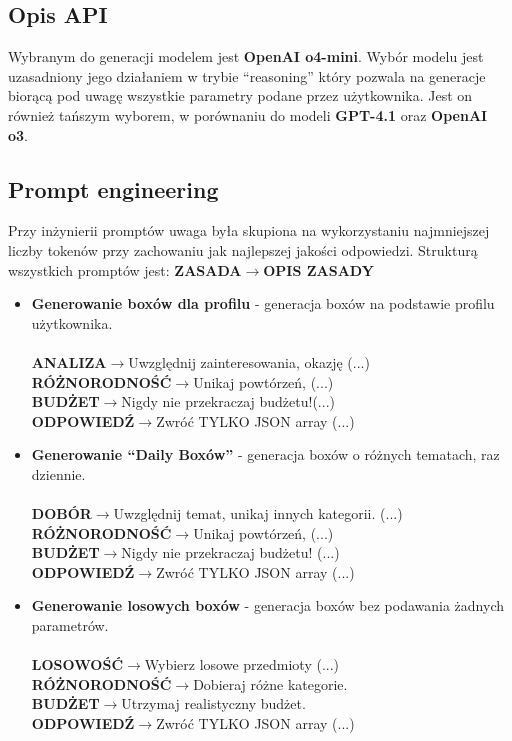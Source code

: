 \documentclass[a4paper, 12pt]{article}
\begin{document}
\subsection{Opis API}
Wybranym do generacji modelem jest \textbf{OpenAI o4-mini}.
Wybór modelu jest uzasadniony
jego działaniem w trybie ``reasoning'' który pozwala na generacje biorącą pod
uwagę wszystkie parametry podane przez użytkownika.
Jest on również tańszym wyborem, w porównaniu do modeli \textbf{GPT-4.1} oraz \textbf{OpenAI o3}.
\subsection{Prompt engineering}
Przy inżynierii promptów uwaga była skupiona na wykorzystaniu najmniejszej liczby tokenów przy zachowaniu jak najlepszej jakości odpowiedzi.
Strukturą wszystkich promptów jest:
\textbf{ZASADA}$\rightarrow$\textbf{OPIS ZASADY}
\begin{itemize}
    \item \textbf{Generowanie boxów dla profilu} - generacja boxów na podstawie profilu użytkownika.\\\\
        \textbf{ANALIZA}$\rightarrow$Uwzględnij zainteresowania, okazję (...) \\
        \textbf{RÓŻNORODNOŚĆ}$\rightarrow$Unikaj powtórzeń, (...) \\
        \textbf{BUDŻET}$\rightarrow$Nigdy nie przekraczaj budżetu!(...) \\
        \textbf{ODPOWIEDŹ}$\rightarrow$Zwróć TYLKO JSON array (...) \\
    \item \textbf{Generowanie ``Daily Boxów''} - generacja boxów o różnych tematach, raz dziennie.\\\\
        \textbf{DOBÓR}$\rightarrow$Uwzględnij temat, unikaj innych kategorii. (...) \\
        \textbf{RÓŻNORODNOŚĆ}$\rightarrow$Unikaj powtórzeń,  (...) \\
        \textbf{BUDŻET}$\rightarrow$Nigdy nie przekraczaj budżetu!  (...) \\
        \textbf{ODPOWIEDŹ}$\rightarrow$Zwróć TYLKO JSON array  (...) \\
    \item \textbf{Generowanie losowych boxów} - generacja boxów bez podawania żadnych parametrów.\\\\
        \textbf{LOSOWOŚĆ}$\rightarrow$Wybierz losowe przedmioty (...) \\
        \textbf{RÓŻNORODNOŚĆ}$\rightarrow$Dobieraj różne kategorie. \\
        \textbf{BUDŻET}$\rightarrow$Utrzymaj realistyczny budżet.\\
        \textbf{ODPOWIEDŹ}$\rightarrow$Zwróć TYLKO JSON array (...) \\
\end{itemize}
\end{document}
